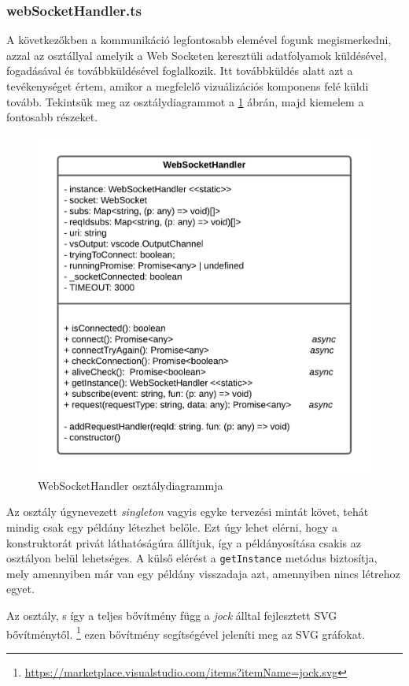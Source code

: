 \subsubsection{webSocketHandler.ts}
A következőkben a kommunikáció legfontosabb elemével fogunk megismerkedni, azzal az osztállyal amelyik a Web Socketen keresztüli adatfolyamok küldésével, fogadásával és továbbküldésével foglalkozik. Itt továbbküldés alatt azt a tevékenységet értem, amikor a megfelelő vizuálizációs komponens felé küldi tovább. Tekintsük meg az osztálydiagrammot a \ref{fig:wsDiagram} ábrán, majd kiemelem a fontosabb részeket.

\begin{figure}[H]
  \centering
  \includegraphics[width=0.8\linewidth]{images/wsDiagram.png}
  \caption{WebSocketHandler osztálydiagrammja}
  \label{fig:wsDiagram}
\end{figure}

Az osztály úgynevezett \textit{singleton} vagyis egyke tervezési mintát követ, tehát mindig csak egy példány létezhet belőle. Ezt úgy lehet elérni, hogy a konstruktorát privát láthatóságúra állítjuk, így a példányosítása csakis az osztályon belül lehetséges. A külső elérést a \lstinline{getInstance} metódus biztosítja, mely amennyiben már van egy példány visszadaja azt, amennyiben nincs létrehoz egyet.

Az osztály, s így a teljes bővítmény függ a \textit{jock} álltal fejlesztett SVG bővítménytől. \footnote{\url{https://marketplace.visualstudio.com/items?itemName=jock.svg}} ezen bővítmény segítségével jeleníti meg az SVG gráfokat.

